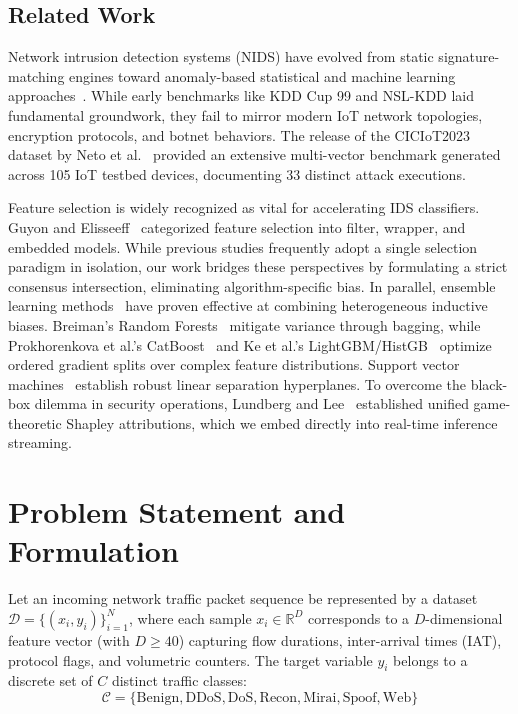 \documentclass[conference]{IEEEtran}
\begin{document}
\subsection{Related Work}
Network intrusion detection systems (NIDS) have evolved from static signature-matching engines toward anomaly-based statistical and machine learning approaches~\cite{sommer, garcia}. While early benchmarks like KDD Cup 99 and NSL-KDD laid fundamental groundwork, they fail to mirror modern IoT network topologies, encryption protocols, and botnet behaviors. The release of the CICIoT2023 dataset by Neto et al.~\cite{ciciot} provided an extensive multi-vector benchmark generated across 105 IoT testbed devices, documenting 33 distinct attack executions.

Feature selection is widely recognized as vital for accelerating IDS classifiers. Guyon and Elisseeff~\cite{guyon} categorized feature selection into filter, wrapper, and embedded models. While previous studies frequently adopt a single selection paradigm in isolation, our work bridges these perspectives by formulating a strict consensus intersection, eliminating algorithm-specific bias. In parallel, ensemble learning methods~\cite{dietterich, kuncheva} have proven effective at combining heterogeneous inductive biases. Breiman's Random Forests~\cite{rf} mitigate variance through bagging, while Prokhorenkova et al.'s CatBoost~\cite{catboost} and Ke et al.'s LightGBM/HistGB~\cite{lightgbm} optimize ordered gradient splits over complex feature distributions. Support vector machines~\cite{svm} establish robust linear separation hyperplanes. To overcome the black-box dilemma in security operations, Lundberg and Lee~\cite{shap, treeshap} established unified game-theoretic Shapley attributions, which we embed directly into real-time inference streaming.

\section{Problem Statement and Formulation}
Let an incoming network traffic packet sequence be represented by a dataset $\mathcal{D} = \{(x_i, y_i)\}_{i=1}^N$, where each sample $x_i \in \mathbb{R}^D$ corresponds to a $D$-dimensional feature vector (with $D \ge 40$) capturing flow durations, inter-arrival times (IAT), protocol flags, and volumetric counters. The target variable $y_i$ belongs to a discrete set of $C$ distinct traffic classes:
\begin{equation}
\mathcal{C} = \{\text{Benign}, \text{DDoS}, \text{DoS}, \text{Recon}, \text{Mirai}, \text{Spoof}, \text{Web}\}
\end{equation}
\end{document}
